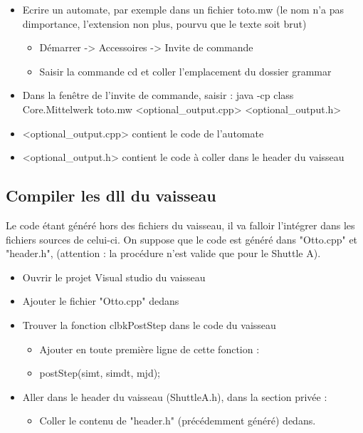 \documentclass[a4paper,11pt]{article}
\begin{document}
\begin{itemize}
	\item Ecrire un automate, par exemple dans un fichier toto.mw (le nom n'a pas dimportance, l'extension non plus, pourvu que le texte soit brut)
	\begin{itemize}
					\item Démarrer -> Accessoires -> Invite de commande
					\item Saisir la commande cd et coller l'emplacement du dossier grammar \newline
	\end{itemize}
	
	\item Dans la fenêtre de l'invite de commande, saisir : java -cp class Core.Mittelwerk toto.mw <optional\_output.cpp> <optional\_output.h>
	\item <optional\_output.cpp> contient le code de l'automate
	\item <optional\_output.h> contient le code à coller dans le header du vaisseau	
\end{itemize}


\subsection{Compiler les dll du vaisseau}

Le code étant généré hors des fichiers du vaisseau, il va falloir l'intégrer dans les fichiers sources de celui-ci.
On suppose que le code est généré dans "Otto.cpp" et "header.h", (attention : la procédure n'est valide que pour le Shuttle A).\newline
\begin{itemize}
	\item Ouvrir le projet Visual studio du vaisseau
	\item Ajouter le fichier "Otto.cpp" dedans
	\item Trouver la fonction clbkPostStep dans le code du vaisseau
	\begin{itemize}
		\item Ajouter en toute première ligne de cette fonction : 
		\item postStep(simt, simdt, mjd);
	\end{itemize}
	\item Aller dans le header du vaisseau (ShuttleA.h), dans la section privée :
	\begin{itemize}
		\item Coller le contenu de "header.h" (précédemment généré) dedans.
	\end{itemize}
	
\end{itemize}
\end{document}
